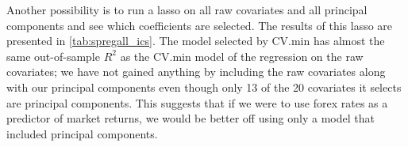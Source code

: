 \documentclass[11pt, fleqn]{article}
\begin{document}


Another possibility is to run a lasso on all raw covariates and all principal components and see which coefficients are selected. The results of this lasso are presented in \cref{tab:spregall_ics}. The model selected by CV.min has almost the same out-of-sample $R^2$ as the CV.min model of the regression on the raw covariates; we have not gained anything by including the raw covariates along with our principal components even though only 13 of the 20 covariates it selects are principal components. This suggests that if we were to use forex rates as a predictor of market returns, we would be better off using only a model that included principal components.


\end{document}

